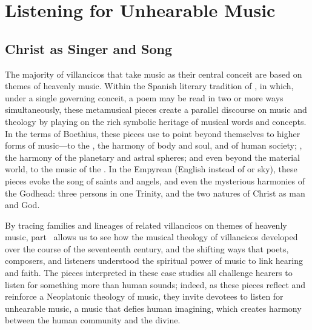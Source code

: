 
\part{Listening for Unhearable Music}
\label{part:ListeningForUnhearableMusic}

\chapter{Christ as Singer and Song}

The majority of villancicos that take music as their central conceit are based
on themes of heavenly music.
Within the Spanish literary tradition of , in which, under a
single governing conceit, a poem may be read in two or more ways simultaneously,
these metamusical pieces create a parallel discourse on music and theology by
playing on the rich symbolic heritage of musical words and concepts.
In the terms of Boethius, these pieces use  to point
beyond themselves to higher forms of music---to the , the
harmony of body and soul, and of human society; , the
harmony of the planetary and astral spheres; and even beyond the material world,
to the music of the .
In the Empyrean (English  instead of  or sky), these
pieces evoke the song of saints and angels, and even the mysterious harmonies of
the Godhead: three persons in one Trinity, and the two natures of Christ as
man and God.

By tracing families and lineages of related villancicos on themes of heavenly
music, part~\ref{part:ListeningForUnhearableMusic} allows us to see how the
musical theology of villancicos developed over the course of the seventeenth
century, and the shifting ways that poets, composers, and listeners understood
the spiritual power of music to link hearing and faith.
The pieces interpreted in these case studies all challenge hearers to listen for
something more than human sounds; indeed, as these pieces reflect and reinforce
a Neoplatonic theology of music, they invite devotees to listen for unhearable
music, a music that defies human imagining, which creates harmony between the
human community and the divine.


